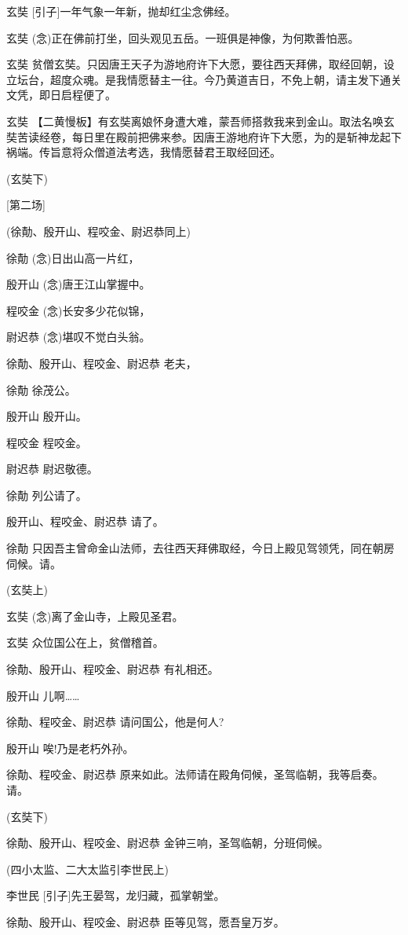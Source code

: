 玄奘 {[}引子{]}一年气象一年新，抛却红尘念佛经。

玄奘 (念)正在佛前打坐，回头观见五岳。一班俱是神像，为何欺善怕恶。

玄奘
贫僧玄奘。只因唐王天子为游地府许下大愿，要往西天拜佛，取经回朝，设立坛台，超度众魂。是我情愿替主一往。今乃黄道吉日，不免上朝，请主发下通关文凭，即日启程便了。

玄奘
【二黄慢板】有玄奘离娘怀身遭大难，蒙吾师搭救我来到金山。取法名唤玄奘苦读经卷，每日里在殿前把佛来参。因唐王游地府许下大愿，为的是斩神龙起下祸端。传旨意将众僧道法考选，我情愿替君王取经回还。

(玄奘下)

{[}第二场{]}

(徐勣、殷开山、程咬金、尉迟恭同上)

徐勣 (念)日出山高一片红，

殷开山 (念)唐王江山掌握中。

程咬金 (念)长安多少花似锦，

尉迟恭 (念)堪叹不觉白头翁。

徐勣、殷开山、程咬金、尉迟恭 老夫，

徐勣 徐茂公。

殷开山 殷开山。

程咬金 程咬金。

尉迟恭 尉迟敬德。

徐勣 列公请了。

殷开山、程咬金、尉迟恭 请了。

徐勣
只因吾主曾命金山法师，去往西天拜佛取经，今日上殿见驾领凭，同在朝房伺候。请。

(玄奘上)

玄奘 (念)离了金山寺，上殿见圣君。

玄奘 众位国公在上，贫僧稽首。

徐勣、殷开山、程咬金、尉迟恭 有礼相还。

殷开山 儿啊\ldots{}\ldots{}

徐勣、程咬金、尉迟恭 请问国公，他是何人?

殷开山 唉!乃是老朽外孙。

徐勣、程咬金、尉迟恭
原来如此。法师请在殿角伺候，圣驾临朝，我等启奏。请。

(玄奘下)

徐勣、殷开山、程咬金、尉迟恭 金钟三响，圣驾临朝，分班伺候。

(四小太监、二大太监引李世民上)

李世民 {[}引子{]}先王晏驾，龙归藏，孤掌朝堂。

徐勣、殷开山、程咬金、尉迟恭 臣等见驾，愿吾皇万岁。

